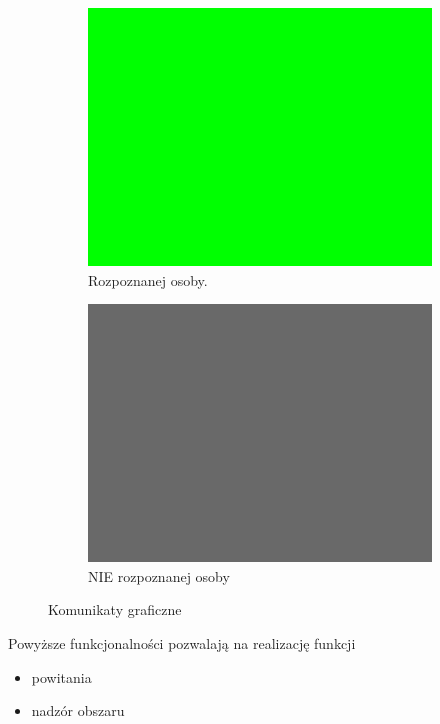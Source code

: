 \documentclass[a4paper,12pt,reqno]{article}
\begin{document}
\begin{figure}[H]%
	\centering
	\begin{subfigure}{.5\textwidth}
		\centering
		\includegraphics[width=0.8\linewidth]{imgs/testy_rozpoznana.jpg}
		\caption{Rozpoznanej osoby.}	
		\label{komunikatgraficzny:rozpoznana}
	\end{subfigure}%
	\begin{subfigure}{.5\textwidth}
		\centering
		\includegraphics[width=0.8\linewidth]{imgs/testy_NIErozpoznana.jpg}
		\caption{NIE rozpoznanej osoby}
		\label{komunikatgraficzny:NIErozpoznana}
	\end{subfigure}%
\caption{Komunikaty graficzne}
\label{komunikatgraficzny:komunikatgraficzny}
\end{figure}

Powyższe funkcjonalności pozwalają na realizację funkcji

\begin{itemize}
	\item powitania
	\item nadzór obszaru
\end{itemize}
\end{document}
